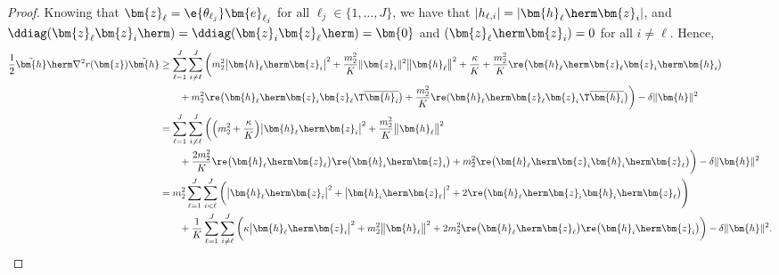 \begin{proof}
Knowing that $\bm{z}_{\ell}=\e{\theta_{\ell_j}}\bm{e}_{\ell_j}$ for all ${\ell}_j\in\{1,\ldots,J\}$, we have that $|{h}_{{\ell},i}|=|\bm{h}_{\ell}\herm\bm{z}_i|$, and  $\ddiag(\bm{z}_{\ell}\bm{z}_i\herm)=\ddiag(\bm{z}_i\bm{z}_{\ell}\herm)=\bm{0}$ and $(\bm{z}_{\ell}\herm\bm{z}_i)=0$ for all $i\neq {\ell}$. Hence,
\begin{align}
	\frac{1}{2}\tilde{\bm{h}}\herm\nabla^2 r(\bm{z})\tilde{\bm{h}}
	&\geq\sum_{{\ell}=1}^J\sum_{i\neq {\ell}}^J\bigg( 
	m_2^2
	\big|\bm{h}_{\ell}\herm\bm{z}_i\big|^2 +\frac{m_2^2}{K} \|\bm{z}_i\|^2\big\|\bm{h}_{\ell}\big\|^2+ \frac{\kappa}{K}
	+\frac{m_2^2}{K}\re\big(\bm{h}_{\ell}\herm \bm{z}_{\ell}\bm{z}_i\herm\bm{h}_i\big)
	\nonumber\\&\qquad 
	+ m_2^2\re\big(\bm{h}_{\ell}\herm\bm{z}_i\bm{z}_{\ell}\T\overline{\bm{h}_i}\big)+\frac{  m_2^2}{K}\re(\bm{h}_{\ell}\herm\bm{z}_{\ell}\bm{z}_i\T\overline{\bm{h}_i} \big) \bigg)
	-\delta\|\bm{h}\|^2
	\nonumber\\
	&=\sum_{{\ell}=1}^J\sum_{i\neq {\ell}}^J\bigg( 
	\Big(m_2^2+\frac{\kappa}{K}\Big)
	\big|\bm{h}_{\ell}\herm\bm{z}_i\big|^2 +\frac{m_2^2}{K} \big\|\bm{h}_{\ell}\big\|^2  
	\nonumber\\&\qquad
	+\frac{2m_2^2}{K}\re\big(\bm{h}_{\ell}\herm \bm{z}_{\ell}\big)\re\big(\bm{h}_i\herm\bm{z}_i\big)
	+ m_2^2\re\big(\bm{h}_{\ell}\herm\bm{z}_i\bm{h}_i\herm\bm{z}_{\ell}\big) \bigg)
	-\delta\|\bm{h}\|^2\nonumber\\
	&=m_2^2\sum_{{\ell}=1}^J\sum_{i< {\ell}}^J\bigg( 
	\big|\bm{h}_{\ell}\herm\bm{z}_i\big|^2 + \big|\bm{h}_i\herm\bm{z}_{\ell}\big|^2+ 2\re\big(\bm{h}_{\ell}\herm\bm{z}_i\bm{h}_i\herm\bm{z}_{\ell}\big)\Bigg)
	\nonumber\\
	&\qquad
	+\frac{1}{K}\sum_{{\ell}=1}^J\sum_{i\neq {\ell}}^J\bigg( 
	\kappa\big|\bm{h}_{\ell}\herm\bm{z}_i\big|^2 +m_2^2\big\|\bm{h}_{\ell}\big\|^2  
	+2m_2^2\re\big(\bm{h}_{\ell}\herm \bm{z}_{\ell}\big)\re\big(\bm{h}_i\herm\bm{z}_i\big)\bigg)
	-\delta\|\bm{h}\|^2.
	\label{appdx:eqn:HessR_Bound}
\end{align}


\end{proof}
